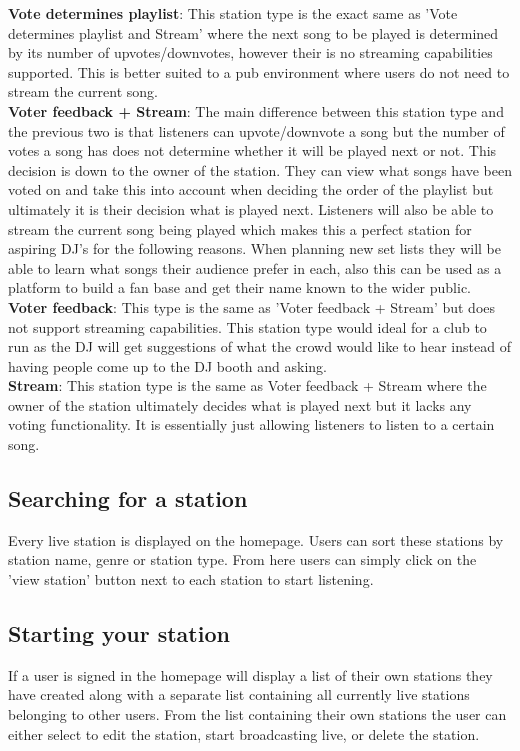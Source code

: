 \documentclass[a4paper, 12pt]{report}
\begin{document}
\textbf{Vote determines playlist}: This station type is the exact same as 'Vote determines playlist and Stream' where the next song to be played is determined by its number of upvotes/downvotes, however their is no streaming capabilities supported. This is better suited to a pub environment where users do not need to stream the current song. \\

\textbf{Voter feedback + Stream}: The main difference between this station type and the previous two is that listeners can upvote/downvote a song but the number of votes a song has does not determine whether it will be played next or not. This decision is down to the owner of the station. They can view what songs have been voted on and take this into account when deciding the order of the playlist but ultimately it is their decision what is played next. 
Listeners will also be able to stream the current song being played which makes this a perfect station for aspiring DJ's for the following reasons. When planning new set lists they will be able to learn what songs their audience prefer in each, also this can be used as a platform to build a fan base and get their name known to the wider public. \\

\textbf{Voter feedback}: This type is the same as 'Voter feedback + Stream' but does not support streaming capabilities. This station type would ideal for a club to run as the DJ will get suggestions of what the crowd would like to hear instead of having people come up to the DJ booth and asking. \\

\textbf{Stream}: This station type is the same as Voter feedback + Stream where the owner of the station ultimately decides what is played next but it lacks any voting functionality. It is essentially just allowing listeners to listen to a certain song. 
 
\subsection{Searching for a station}
Every live station is displayed on the homepage. Users can sort these stations by station name, genre or station type. From here users can simply click on the 'view station' button next to each station to start listening.

\subsection{Starting your station}
If a user is signed in the homepage will display a list of their own stations they have created along with a separate list containing all currently live stations belonging to other users. From the list containing their own stations the user can either select to edit the station, start broadcasting live, or delete the station.
 
\end{document}
